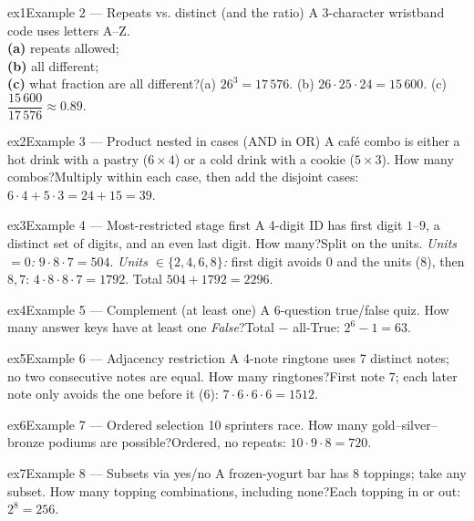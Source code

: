 \documentclass[11pt]{article}
\begin{document}
\begin{example}{ex1}{Example 2 --- Repeats vs. distinct (and the ratio)}
A 3-character wristband code uses letters A--Z. \\ \textbf{(a)} repeats allowed; \\ \textbf{(b)} all different; \\ \textbf{(c)} what fraction are all different?\soln (a) $26^3=17\,576$. (b) $26\cdot25\cdot24=15\,600$. (c) $\dfrac{15\,600}{17\,576}\approx0.89$.
\end{example}

\begin{example}{ex2}{Example 3 --- Product nested in cases (AND in OR)}
A café combo is either a hot drink with a pastry ($6\times4$) or a cold drink with a cookie ($5\times3$). How many combos?\soln Multiply within each case, then add the disjoint cases: $6\cdot4+5\cdot3=24+15=39$.
\end{example}

\begin{example}{ex3}{Example 4 --- Most-restricted stage first}
A 4-digit ID has first digit $1$--$9$, a distinct set of digits, and an even last digit. How many?\soln Split on the units. \emph{Units $=0$:} $9\cdot8\cdot7=504$. \emph{Units $\in\{2,4,6,8\}$:} first digit avoids $0$ and the units ($8$), then $8,7$: $4\cdot8\cdot8\cdot7=1792$. Total $504+1792=2296$.
\end{example}

\begin{example}{ex4}{Example 5 --- Complement (at least one)}
A 6-question true/false quiz. How many answer keys have at least one \emph{False}?\soln Total $-$ all-True: $2^6-1=63$.
\end{example}

\begin{example}{ex5}{Example 6 --- Adjacency restriction}
A 4-note ringtone uses 7 distinct notes; no two consecutive notes are equal. How many ringtones?\soln First note $7$; each later note only avoids the one before it ($6$): $7\cdot6\cdot6\cdot6=1512$.
\end{example}

\begin{example}{ex6}{Example 7 --- Ordered selection}
10 sprinters race. How many gold--silver--bronze podiums are possible?\soln Ordered, no repeats: $10\cdot9\cdot8=720$.
\end{example}

\begin{example}{ex7}{Example 8 --- Subsets via yes/no}
A frozen-yogurt bar has 8 toppings; take any subset. How many topping combinations, including none?\soln Each topping in or out: $2^8=256$.
\end{example}
\end{document}
